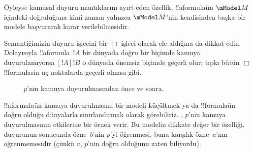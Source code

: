 \documentclass[../../../include/open-logic-section]{subfiles}
\begin{document}
Öyleyse kamusal duyuru mantıklarını ayırt eden özellik, !!a{formula}{}ün
$\mModel M$ içindeki doğruluğuna kimi zaman yalnızca $\mModel M$'nin
kendisinden başka bir modele başvurarak karar verilebilmesidir.

Semantiğimizin duyuru işlecini bir $\Box$ işleci olarak ele aldığına da dikkat
edin. Dolayısıyla !!a{formula}~$!A$ bir dünyada doğru bir biçimde kamuya
duyurulamıyorsa $[!A]!B$ o dünyada önemsiz biçimde geçerli olur; tıpkı bütün
$\Box$ !!{formula}s{}in uç noktalarda geçerli olması gibi.

\begin{figure}
  \begin{center}
  \end{center}
  \caption{$p$'nin kamuya duyurulmasından önce ve sonra.}
\end{figure}

!!a{formula}{}ün kamuya duyurulmasını bir modeli küçültmek ya da !!{formula}{}ün
doğru olduğu dünyalarla sınırlandırmak olarak görebiliriz.
, $p$'nin kamuya duyurulmasının etkilerine bir
örnek verir. Bu modelin dikkate değer bir özelliği, duyurunun sonucunda
özne~$b$'nin $p$'yi öğrenmesi, buna karşılık özne~$a$'nın öğrenmemesidir
(çünkü $a$, $p$'nin doğru olduğunu zaten biliyordu).
\end{document}
